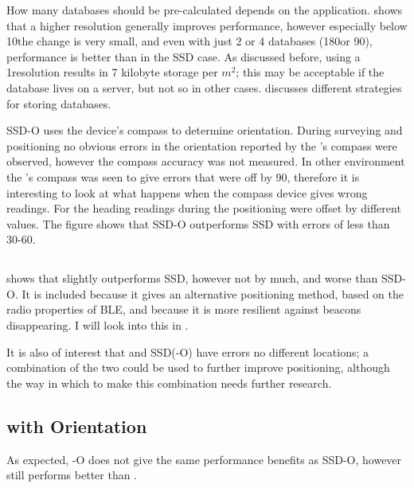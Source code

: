 How many databases should be pre-calculated depends on the application.
 shows that a higher resolution generally improves performance, however especially below 10\textdegree the change is very small, and even with just 2 or 4 databases (180\textdegree or 90\textdegree), performance is better than in the SSD case.
As discussed before, using a 1\textdegree resolution results in 7 kilobyte storage per $m^2$; this may be acceptable if the database lives on a server, but not so in other cases.
 discusses different strategies for storing databases.

SSD-O uses the device's compass to determine orientation.
During surveying and positioning no obvious errors in the orientation reported by the \device's compass were observed, however the compass accuracy was not measured.
In other environment the \device's compass was seen to give errors that were off by 90\textdegree, therefore it is interesting to look at what happens when the compass device gives wrong readings.
For  the heading readings during the positioning were offset by different values.
The figure shows that SSD-O outperforms SSD with errors of less than 30-60\textdegree.

\subsection{\BRP}
 shows that \aBRP slightly outperforms SSD, however not by much, and worse than SSD-O.
It is included because it gives an alternative positioning method, based on the radio properties of BLE, and because it is more resilient against beacons disappearing.
I will look into this in .

It is also of interest that \aBRP and SSD(-O) have errors no different locations; a combination of the two could be used to further improve positioning, although the way in which to make this combination needs further research.

\subsection{\BRP with Orientation}
As expected, \aBRP-O does not give the same performance benefits as SSD-O, however still performs better than \aBRP.

